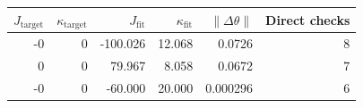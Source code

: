 \begin{tabular}{rrrrrr}
$J_\mathrm{target}$ & $\kappa_\mathrm{target}$ & $J_\mathrm{fit}$ & $\kappa_\mathrm{fit}$ & $\|\Delta\theta\|$ & Direct checks \\
\hline
-0 & 0 & -100.026 & 12.068 & 0.0726 & 8 \\
0 & 0 & 79.967 & 8.058 & 0.0672 & 7 \\
-0 & 0 & -60.000 & 20.000 & 0.000296 & 6 \\
\end{tabular}
